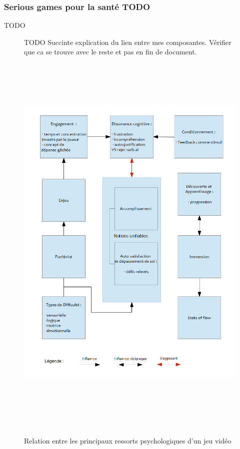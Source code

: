 	\subsubsection{Serious games pour la santé TODO}
TODO 
\begin{figure}
TODO Succinte explication du lien entre mes composantes. Vérifier que ca se trouve avec le reste et pas en fin de document.
	\centering
	\includegraphics[height=19.6cm]{images/lien_theories}
	\caption{Relation entre les principaux ressorts psychologiques d'un jeu vidéo}
	\label{lien_theories}
\end{figure}